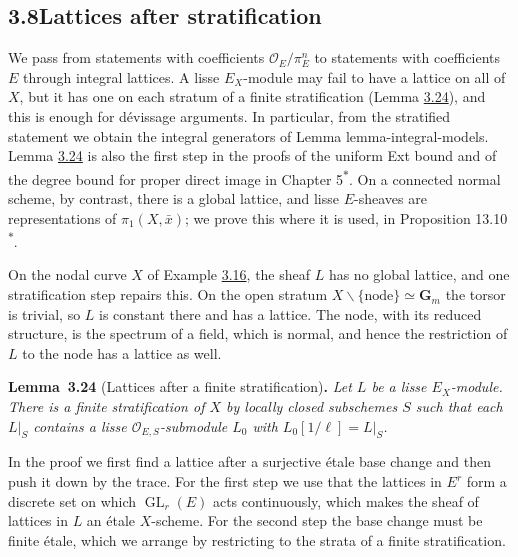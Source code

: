 \documentclass[11pt]{article}
\newenvironment{bpstatement}[2]{\par\addvspace{0.6\baselineskip}\noindent\textbf{#1}#2\textbf{.}\enspace\ignorespaces}
  {\par\addvspace{0.4\baselineskip}}
\newenvironment{bpstatementit}[2]{\begin{bpstatement}{#1}{#2}\itshape\ignorespaces}{\end{bpstatement}}
\newcommand{\bpout}[1]{#1\textsuperscript{\hyperlink{bp-outside}{\ensuremath{\ast}}}}
\providecommand{\GL}{}\renewcommand{\GL}{\operatorname{GL}}
\begin{document}
\subsection*{\texorpdfstring{3.8\quad Lattices after stratification}{3.8 Lattices after stratification}}
\label{bp75}%
\label{bp76}%
We pass from statements with coefficients \(\mathcal O_E/\pi_E^n\) to statements with coefficients \(E\) through integral lattices. A lisse \(E_X\)-module may fail to have a lattice on all of \(X\), but it has one on each stratum of a finite stratification (Lemma \hyperref[bp77]{3.24}), and this is enough for dévissage arguments. In particular, from the stratified statement we obtain the integral generators of Lemma lemma-integral-models. Lemma \hyperref[bp77]{3.24} is also the first step in the proofs of the uniform Ext bound and of the degree bound for proper direct image in Chapter \bpout{5}. On a connected normal scheme, by contrast, there is a global lattice, and lisse \(E\)-sheaves are representations of \(\pi_1(X,\bar x)\); we prove this where it is used, in Proposition \bpout{13.10}.

On the nodal curve \(X\) of Example \hyperref[bp51]{3.16}, the sheaf \(L\) has no global lattice, and one stratification step repairs this. On the open stratum \(X\smallsetminus\{\text{node}\}\simeq\mathbf G_m\) the torsor is trivial, so \(L\) is constant there and has a lattice. The node, with its reduced structure, is the spectrum of a field, which is normal, and hence the restriction of \(L\) to the node has a lattice as well.

\label{bp77}%
\begin{bpstatementit}{Lemma~3.24}{ (Lattices after a finite stratification)}
Let \(L\) be a lisse \(E_X\)-module. There is a finite stratification of \(X\) by locally closed subschemes \(S\) such that each \(L|_S\) contains a lisse \(\mathcal O_{E,S}\)-submodule \(L_0\) with \(L_0[1/\ell]=L|_S\).
\end{bpstatementit}

\label{bp78}%
In the proof we first find a lattice after a surjective étale base change and then push it down by the trace. For the first step we use that the lattices in \(E^r\) form a discrete set on which \(\GL_r(E)\) acts continuously, which makes the sheaf of lattices in \(L\) an étale \(X\)-scheme. For the second step the base change must be finite étale, which we arrange by restricting to the strata of a finite stratification.
\end{document}
